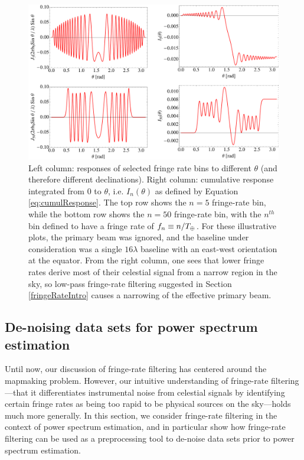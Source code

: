 \documentclass[twocolumn,apj,numberedappendix]{emulateapj}
\begin{document}
\begin{figure}
\centering
\includegraphics[width=1.0\textwidth]{plots/besselContributions.pdf}
\caption{
Left column: responses of selected fringe rate bins to different $\theta$ (and
therefore different declinations).  Right column: cumulative response
integrated from $0$ to $\theta$, i.e. $I_n (\theta)$ as defined by Equation
\eqref{eq:cumulResponse}.  The top row shows the $n=5$ fringe-rate bin, while
the bottom row shows the $n=50$ fringe-rate bin, with the $n^{th}$ bin defined
to have a fringe rate of $f_n \equiv n / T_\oplus$.  For these illustrative
plots, the primary beam was ignored, and the baseline under consideration was a
single $16\lambda$ baseline with an east-west orientation at the equator.  From
the right column, one sees that lower fringe rates derive most of their
celestial signal from a narrow region in the sky, so low-pass fringe-rate
filtering suggested in Section \ref{fringeRateIntro} causes a narrowing of the
effective primary beam.
}
\label{besselContributions}
\end{figure}

\subsection{De-noising data sets for power spectrum estimation}
Until now, our discussion of fringe-rate filtering has centered around the mapmaking problem.  However, our intuitive understanding of fringe-rate filtering---that it differentiates instrumental noise from celestial signals by identifying certain fringe rates as being too rapid to be physical sources on the sky---holds much more generally.  In this section, we consider fringe-rate filtering in the context of power spectrum estimation, and in particular show how fringe-rate filtering can be used as a preprocessing tool to de-noise data sets prior to power spectrum estimation.
\end{document}
